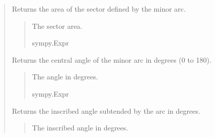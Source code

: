 \documentclass[letterpaper,10pt,english]{sphinxmanual}
\begin{document}
\begin{quote}
\begin{fulllineitems}
\begin{quote}
\begin{description}
\end{description}\end{quote}

\begin{fulllineitems}
\label{\detokenize{pygeox:pygeox.basic_objects.MinorArc.area}}
\pysigstartsignatures
\pysigline
{}
\pysigstopsignatures
\sphinxAtStartPar
Returns the area of the sector defined by the minor arc.
\begin{quote}\begin{description}
\sphinxAtStartPar
The sector area.

\sphinxAtStartPar
sympy.Expr

\end{description}\end{quote}

\end{fulllineitems}


\begin{fulllineitems}
\label{\detokenize{pygeox:pygeox.basic_objects.MinorArc.central_angle}}
\pysigstartsignatures
\pysigline
{}
\pysigstopsignatures
\sphinxAtStartPar
Returns the central angle of the minor arc in degrees (0 to 180).
\begin{quote}\begin{description}
\sphinxAtStartPar
The angle in degrees.

\sphinxAtStartPar
sympy.Expr

\end{description}\end{quote}

\end{fulllineitems}


\begin{fulllineitems}
\label{\detokenize{pygeox:pygeox.basic_objects.MinorArc.inscribed_angle}}
\pysigstartsignatures
\pysigline
{}
\pysigstopsignatures
\sphinxAtStartPar
Returns the inscribed angle subtended by the arc in degrees.
\begin{quote}\begin{description}
\sphinxAtStartPar
The inscribed angle in degrees.


\end{description}
\end{quote}
\end{fulllineitems}
\end{fulllineitems}
\end{quote}
\end{document}
